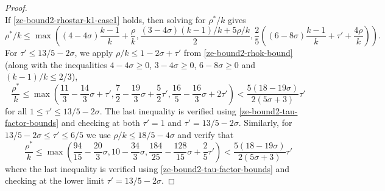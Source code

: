 \begin{proof}
\begin{equation}
\end{equation}
If \eqref{ze-bound2-rhostar-k1-case1} holds, then solving for $\rho^*/k$ gives
\[
\rho^*/k \le \max((4 - 4\sigma)\frac{k - 1}{k} + \frac{\rho}{k}, \frac{(3 - 4\sigma)(k - 1)/k + 5\rho/k}{2}, \frac{2}{5}((6 - 8\sigma)\frac{k - 1}{k} + \tau' + \frac{4\rho}{k})).
\]
For $\tau' \le 13/5 - 2\sigma$, we apply $\rho/k \le 1 - 2\sigma + \tau'$ from \eqref{ze-bound2-rhok-bound} (along with the inequalities $4 - 4\sigma \ge 0$, $3 - 4\sigma \ge 0$, $6 - 8\sigma \ge 0$ and $(k - 1)/k \le 2/3$),
\[
\frac{\rho^*}{k} \le \max\left(\frac{11}{3} - \frac{14}{3}\sigma + \tau', \frac{7}{2} - \frac{19}{3}\sigma + \frac{5}{2}\tau', \frac{16}{5} - \frac{16}{3}\sigma + 2\tau'\right) < \frac{5(18 - 19\sigma)}{2(5\sigma + 3)}\tau'
\]
for all $1 \le \tau' \le 13/5 - 2\sigma$. The last inequality is verified using \eqref{ze-bound2-tau-factor-bounds} and checking at both $\tau' = 1$ and $\tau' = 13/5-2\sigma$. Similarly, for $13/5 - 2\sigma \le \tau' \le 6/5$ we use $\rho/k \le 18/5-4\sigma$ and verify that
\[
\frac{\rho^*}{k} \le \max\left(\frac{94}{15} - \frac{20}{3}\sigma, 10 - \frac{34}{3}\sigma, \frac{184}{25} - \frac{128}{15}\sigma + \frac{2}{5}\tau'\right) < \frac{5(18 - 19\sigma)}{2(5\sigma + 3)}\tau'
\]
where the last inequality is verified using \eqref{ze-bound2-tau-factor-bounds} and checking at the lower limit $\tau' = 13/5 - 2\sigma$.


\end{proof}
